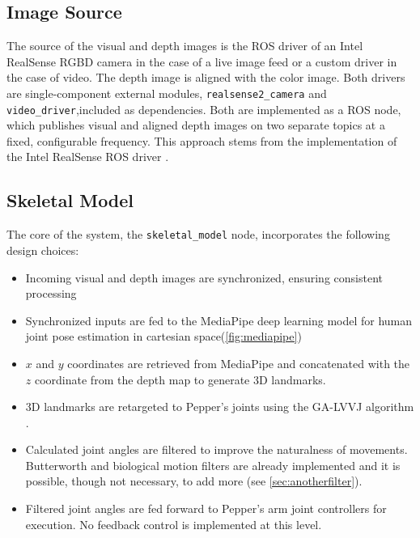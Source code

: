 \documentclass{CSSRforAfrica}
\begin{document}
\subsection{Image Source}

The source of the visual and depth images is the ROS driver of an Intel RealSense RGBD camera \cite{realsense_ros} in the case of a live image feed or a custom driver in the case of video. The depth image is aligned with the color image. Both drivers are single-component external modules, \texttt{realsense2\_camera} and \texttt{video\_driver},included as dependencies. Both are implemented as a ROS node, which publishes visual and aligned depth images on two separate topics at a fixed, configurable frequency. This approach stems from the implementation of the Intel RealSense ROS driver \cite{realsense_ros}.

\subsection{Skeletal Model}

The core of the system, the \texttt{skeletal\_model} node, incorporates the following design choices:

\begin{itemize}
    \item Incoming visual and depth images are synchronized, ensuring consistent processing
    \item Synchronized inputs are fed to the MediaPipe deep learning model for human joint pose estimation in cartesian space(\cref{fig:mediapipe})
    \item \(x\) and \(y\) coordinates are retrieved from MediaPipe and concatenated with the \(z\) coordinate from the depth map to generate 3D landmarks.
    \item 3D landmarks are retargeted to Pepper's joints using the GA-LVVJ algorithm \cite{zhang2018real}.
    \item Calculated joint angles are filtered to improve the naturalness of movements. Butterworth and biological motion filters are already implemented and it is possible, though not necessary, to add more (see \cref{sec:anotherfilter}).
    \item Filtered joint angles are fed forward to Pepper’s arm joint controllers for execution. No feedback control is implemented at this level. 
\end{itemize}
\newpage
\end{document}
